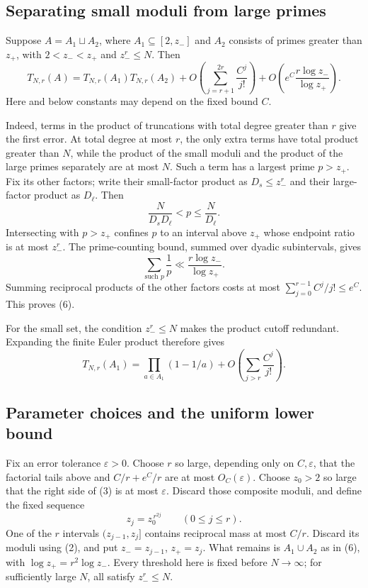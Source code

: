 \subsection*{Separating small moduli from large primes}
Suppose \(A=A_1\sqcup A_2\), where \(A_1\subseteq[2,z_-]\) and \(A_2\) consists of primes greater than \(z_+\), with \(2<z_-<z_+\) and \(z_-^r\leq N\). Then
\[
T_{N,r}(A)=T_{N,r}(A_1)T_{N,r}(A_2)
+O\left(\sum_{j=r+1}^{2r}\frac{C^j}{j!}\right)
+O\left(e^C\frac{r\log z_-}{\log z_+}\right). \tag{6}
\]
Here and below constants may depend on the fixed bound \(C\).

Indeed, terms in the product of truncations with total degree greater than \(r\) give the first error. At total degree at most \(r\), the only extra terms have total product greater than \(N\), while the product of the small moduli and the product of the large primes separately are at most \(N\). Such a term has a largest prime \(p>z_+\). Fix its other factors; write their small-factor product as \(D_s\leq z_-^r\) and their large-factor product as \(D_\ell\). Then
\[
\frac{N}{D_sD_\ell}<p\leq\frac N{D_\ell}.
\]
Intersecting with \(p>z_+\) confines \(p\) to an interval above \(z_+\) whose endpoint ratio is at most \(z_-^r\). The prime-counting bound, summed over dyadic subintervals, gives
\[
\sum_{\text{such }p}\frac1p
\ll \frac{r\log z_-}{\log z_+}.
\]
Summing reciprocal products of the other factors costs at most
\(\sum_{j=0}^{r-1}C^j/j!\leq e^C\). This proves (6).

For the small set, the condition \(z_-^r\leq N\) makes the product cutoff redundant. Expanding the finite Euler product therefore gives
\[
T_{N,r}(A_1)=\prod_{a\in A_1}(1-1/a)
 +O\left(\sum_{j>r}\frac{C^j}{j!}\right). \tag{7}
\]

\subsection*{Parameter choices and the uniform lower bound}
Fix an error tolerance \(\varepsilon>0\). Choose \(r\) so large, depending only on \(C,\varepsilon\), that the factorial tails above and \(C/r+e^C/r\) are at most \(O_C(\varepsilon)\). Choose \(z_0>2\) so large that the right side of (3) is at most \(\varepsilon\). Discard those composite moduli, and define the fixed sequence
\[
z_j=z_0^{\,r^{2j}}\qquad(0\leq j\leq r).
\]
One of the \(r\) intervals \((z_{j-1},z_j]\) contains reciprocal mass at most \(C/r\). Discard its moduli using (2), and put \(z_-=z_{j-1}\), \(z_+=z_j\). What remains is \(A_1\cup A_2\) as in (6), with
\(\log z_+ =r^2\log z_-\). Every threshold here is fixed before \(N\to\infty\); for sufficiently large \(N\), all satisfy \(z_-^r\leq N\).

